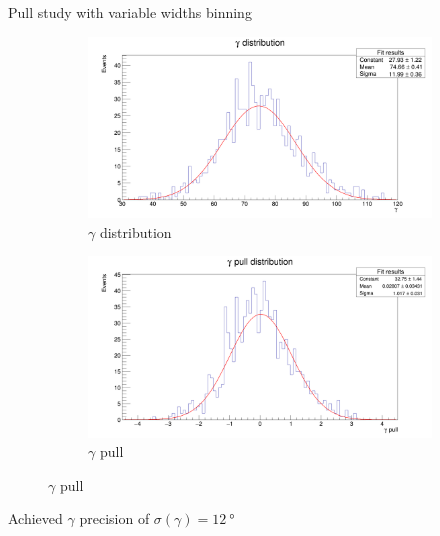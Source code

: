 \documentclass{beamer}
\begin{document}
\begin{frame}{Pull study with variable widths binning}
  \begin{figure}
    \centering
    \vspace{-0.2cm}
    \begin{subfigure}{0.5\textwidth}
      \includegraphics[width = 1.0\textwidth]{GammaDistribution8BinsVariableWidth.png}
      \caption{$\gamma$ distribution}
    \end{subfigure}%
    \begin{subfigure}{0.5\textwidth}
      \includegraphics[width = 1.0\textwidth]{GammaPull8BinsVariableWidth.png}
      \caption{$\gamma$ pull}
    \end{subfigure}
  \end{figure}
  \begin{center}
    Achieved $\gamma$ precision of $\sigma(\gamma) = \SI{12}{\degree}$
  \end{center}
\end{frame}
\end{document}
